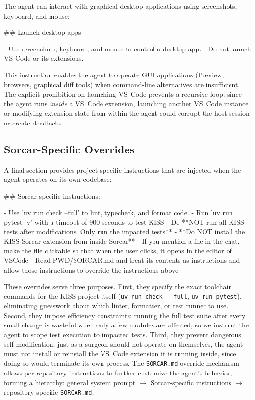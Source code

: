 \documentclass{article}
\begin{document}
The agent can interact with graphical desktop applications using
screenshots, keyboard, and mouse:

\begin{prompt}
## Launch desktop apps

- Use screenshots, keyboard, and mouse to control a
  desktop app.
- Do not launch VS Code or its extensions.
\end{prompt}

\noindent This instruction enables the agent to operate GUI applications
(Preview, browsers, graphical diff tools) when command-line
alternatives are insufficient.  The explicit prohibition on launching
VS~Code prevents a recursive loop: since the agent runs \emph{inside}
a VS~Code extension, launching another VS~Code instance or modifying
extension state from within the agent could corrupt the host session
or create deadlocks.

\subsection{Sorcar-Specific Overrides}

A final section provides project-specific instructions that are
injected when the agent operates on its own codebase:

\begin{prompt}
## Sorcar-specific instructions:

- Use 'uv run check --full' to lint, typecheck, and format
  code.
- Run 'uv run pytest -v' with a timeout of 900 seconds to
  test KISS
- Do **NOT run all KISS tests after modifications. Only run
  the impacted tests**
- **Do NOT install the KISS Sorcar extension from inside
  Sorcar**
- If you mention a file in the chat, make the file
  clickable so that when the user clicks, it opens in the
  editor of VSCode
- Read PWD/SORCAR.md and treat its contents as
  instructions and allow those instructions to override the
  instructions above
\end{prompt}

\noindent These overrides serve three purposes.  First, they specify the
exact toolchain commands for the KISS project itself (\texttt{uv run
check -{}-full}, \texttt{uv run pytest}), eliminating guesswork about
which linter, formatter, or test runner to use.  Second, they impose
efficiency constraints: running the full test suite after every small
change is wasteful when only a few modules are affected, so we
instruct the agent to scope test execution to impacted tests.  Third,
they
prevent dangerous self-modification: just as a surgeon should not
operate on themselves, the agent must not install or reinstall the
VS~Code extension it is running inside, since doing so would terminate
its own process.  The \texttt{SORCAR.md} override mechanism allows
per-repository instructions to further customize the agent's behavior,
forming a hierarchy: general system prompt $\rightarrow$
Sorcar-specific instructions $\rightarrow$ repository-specific
\texttt{SORCAR.md}.
\end{document}

